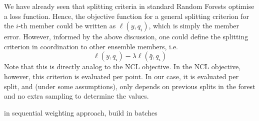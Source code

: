 \documentclass[
    a4paper, %
	fontsize=10pt, %
	twoside=false, %
]{kaobook}
\begin{document}
We have already seen that splitting criteria in standard Random Forests optimise a loss function. Hence, the objective function for a general splitting criterion for the $i$-th member could be written as  $\ell(y, q_{i})$, which is simply the member error. However, informed by the above discussion, one could define the splitting criterion in coordination to other ensemble members, i.e.
$$
\ell(y, q_{i}) - \lambda \ell(\bar{q}, q_{i})
$$
Note that this is directly analog to the NCL objective. In the NCL objective, however, this criterion is evaluated per point. In our case, it is evaluated per split, and (under some assumptions), only depends on previous splits in the forest and no extra sampling to determine the values.

in sequential weighting approach, build in batches


\backmatter %



\printbibliography[heading=bibintoc, title=Bibliography, prenote=bibnote] %



\printindex %
\end{document}

